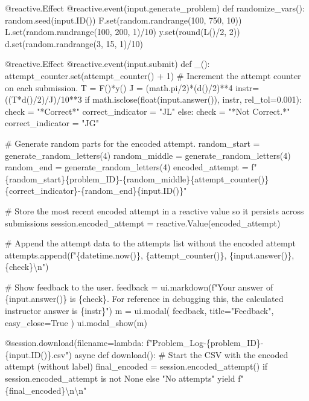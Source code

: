 \documentclass[
  letterpaper,
  DIV=11,
  numbers=noendperiod]{scrreprt}
\newenvironment{Shaded}{\begin{snugshade}}{\end{snugshade}}
\newcommand{\NormalTok}[1]{\textcolor[rgb]{0.00,0.23,0.31}{#1}}
\begin{document}
\begin{Shaded}
\begin{Highlighting}[]
\NormalTok{    @reactive.Effect}
\NormalTok{    @reactive.event(input.generate\_problem)}
\NormalTok{    def randomize\_vars():}
\NormalTok{        random.seed(input.ID())}
\NormalTok{        F.set(random.randrange(100, 750, 10))}
\NormalTok{        L.set(random.randrange(100, 200, 1)/10)}
\NormalTok{        y.set(round(L()/2, 2))}
\NormalTok{        d.set(random.randrange(3, 15, 1)/10)}
        
\NormalTok{    @reactive.Effect}
\NormalTok{    @reactive.event(input.submit)}
\NormalTok{    def \_():}
\NormalTok{        attempt\_counter.set(attempt\_counter() + 1)  \# Increment the attempt counter on each submission.}
\NormalTok{        T = F()*y()}
\NormalTok{        J = (math.pi/2)*(d()/2)**4}
\NormalTok{        instr= ((T*d()/2)/J)/10**3}
\NormalTok{        if math.isclose(float(input.answer()), instr, rel\_tol=0.001):}
\NormalTok{            check = "*Correct*"}
\NormalTok{            correct\_indicator = "JL"}
\NormalTok{        else:}
\NormalTok{            check = "*Not Correct.*"}
\NormalTok{            correct\_indicator = "JG"}

\NormalTok{        \# Generate random parts for the encoded attempt.}
\NormalTok{        random\_start = generate\_random\_letters(4)}
\NormalTok{        random\_middle = generate\_random\_letters(4)}
\NormalTok{        random\_end = generate\_random\_letters(4)}
\NormalTok{        encoded\_attempt = f"\{random\_start\}\{problem\_ID\}{-}\{random\_middle\}\{attempt\_counter()\}\{correct\_indicator\}{-}\{random\_end\}\{input.ID()\}"}

\NormalTok{        \# Store the most recent encoded attempt in a reactive value so it persists across submissions}
\NormalTok{        session.encoded\_attempt = reactive.Value(encoded\_attempt)}

\NormalTok{        \# Append the attempt data to the attempts list without the encoded attempt}
\NormalTok{        attempts.append(f"\{datetime.now()\}, \{attempt\_counter()\}, \{input.answer()\}, \{check\}\textbackslash{}n")}

\NormalTok{        \# Show feedback to the user.}
\NormalTok{        feedback = ui.markdown(f"Your answer of \{input.answer()\} is \{check\}. For reference in debugging this, the calculated instructor answer is \{instr\}")}
\NormalTok{        m = ui.modal(}
\NormalTok{            feedback,}
\NormalTok{            title="Feedback",}
\NormalTok{            easy\_close=True}
\NormalTok{        )}
\NormalTok{        ui.modal\_show(m)}

\NormalTok{    @session.download(filename=lambda: f"Problem\_Log{-}\{problem\_ID\}{-}\{input.ID()\}.csv")}
\NormalTok{    async def download():}
\NormalTok{        \# Start the CSV with the encoded attempt (without label)}
\NormalTok{        final\_encoded = session.encoded\_attempt() if session.encoded\_attempt is not None else "No attempts"}
\NormalTok{        yield f"\{final\_encoded\}\textbackslash{}n\textbackslash{}n"}
        

\end{Highlighting}
\end{Shaded}
\end{document}
